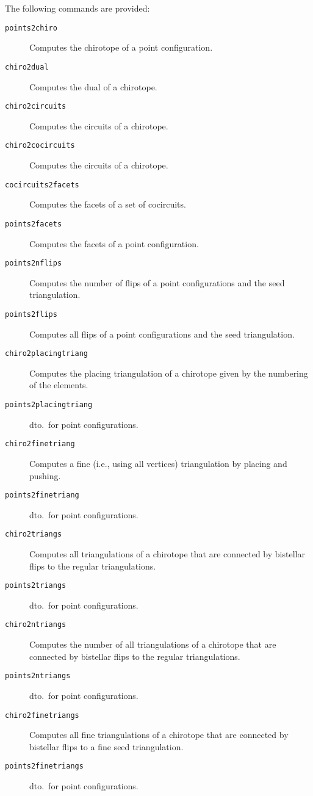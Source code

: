 \documentclass[12pt,a4paper]{article}
\begin{document}
The following commands are provided:
\begin{description}
\item[\texttt{points2chiro}] Computes the chirotope of a point configuration.

\item[\texttt{chiro2dual}] Computes the dual of a chirotope.
\item[\texttt{chiro2circuits}] Computes the circuits of a chirotope.
\item[\texttt{chiro2cocircuits}] Computes the circuits of a chirotope.
\item[\texttt{cocircuits2facets}] Computes the facets of a set of cocircuits.

\item[\texttt{points2facets}] Computes the facets of a point configuration.

\item[\texttt{points2nflips}] Computes the number of flips of a point
  configurations and the seed triangulation.
\item[\texttt{points2flips}] Computes all flips of a point configurations and the
  seed triangulation.

\item[\texttt{chiro2placingtriang}] Computes the placing triangulation of a
  chirotope given by the numbering of the elements.
\item[\texttt{points2placingtriang}] dto.\ for point configurations.

\item[\texttt{chiro2finetriang}] Computes a fine (i.e., using all vertices)
  triangulation by placing and pushing.
\item[\texttt{points2finetriang}] dto.\ for point configurations.

\item[\texttt{chiro2triangs}] Computes all triangulations of a chirotope that
  are connected by bistellar flips to the regular triangulations.
\item[\texttt{points2triangs}] dto.\ for point configurations.

\item[\texttt{chiro2ntriangs}] Computes the number of all triangulations of a
  chirotope that are connected by bistellar flips to the regular triangulations.
\item[\texttt{points2ntriangs}] dto.\ for point configurations.

\item[\texttt{chiro2finetriangs}] Computes all fine triangulations of a
  chirotope that are connected by bistellar flips to a fine seed
  triangulation.
\item[\texttt{points2finetriangs}] dto.\ for point configurations.


\end{description}
\end{document}
